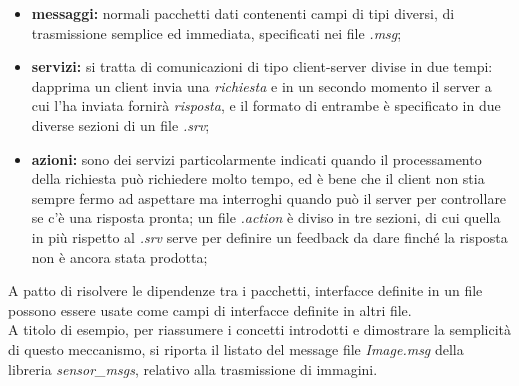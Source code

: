 \begin{itemize}
    \item \textbf{messaggi:} normali pacchetti dati contenenti campi di tipi diversi, di trasmissione semplice ed immediata, specificati nei file \emph{.msg};
    \item \textbf{servizi:} si tratta di comunicazioni di tipo client-server divise in due tempi: dapprima un client invia una \emph{richiesta} e in un secondo momento il server a cui l'ha inviata fornirà \emph{risposta}, e il formato di entrambe è specificato in due diverse sezioni di un file \emph{.srv};
    \item \textbf{azioni:} sono dei servizi particolarmente indicati quando il processamento della richiesta può richiedere molto tempo, ed è bene che il client non stia sempre fermo ad aspettare ma interroghi quando può il server per controllare se c'è una risposta pronta; un file \emph{.action} è diviso in tre sezioni, di cui quella in più rispetto al \emph{.srv} serve per definire un feedback da dare finché la risposta non è ancora stata prodotta;
\end{itemize}
A patto di risolvere le dipendenze tra i pacchetti, interfacce definite in un file possono essere usate come campi di interfacce definite in altri file.\\
A titolo di esempio, per riassumere i concetti introdotti e dimostrare la semplicità di questo meccanismo, si riporta il listato del message file \emph{Image.msg} della libreria \emph{sensor\_msgs}, relativo alla trasmissione di immagini.
\newpage


